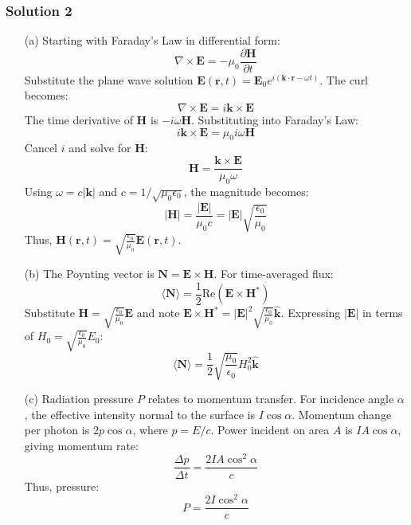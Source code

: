 \documentclass{article}
\begin{document}
\subsubsection{Solution 2}
\begin{enumerate}
    \item[(a)] Starting with Faraday's Law in differential form:
\[
\nabla \times \mathbf{E} = -\mu_0 \frac{\partial \mathbf{H}}{\partial t}
\]
Substitute the plane wave solution \(\mathbf{E}(\mathbf{r}, t) = \mathbf{E}_0 e^{i(\mathbf{k} \cdot \mathbf{r} - \omega t)}\). The curl becomes:
\[
\nabla \times \mathbf{E} = i\mathbf{k} \times \mathbf{E}
\]
The time derivative of \(\mathbf{H}\) is \(-i\omega \mathbf{H}\). Substituting into Faraday's Law:
\[
i\mathbf{k} \times \mathbf{E} = \mu_0 i\omega \mathbf{H}
\]
Cancel \(i\) and solve for \(\mathbf{H}\):
\[
\mathbf{H} = \frac{\mathbf{k} \times \mathbf{E}}{\mu_0 \omega}
\]
Using \(\omega = c|\mathbf{k}|\) and \(c = 1/\sqrt{\mu_0 \epsilon_0}\), the magnitude becomes:
\[
|\mathbf{H}| = \frac{|\mathbf{E}|}{\mu_0 c} = |\mathbf{E}| \sqrt{\frac{\epsilon_0}{\mu_0}}
\]
Thus, \(\mathbf{H}(\mathbf{r}, t) = \sqrt{\frac{\epsilon_0}{\mu_0}} \mathbf{E}(\mathbf{r}, t)\).

    \item[(b)] The Poynting vector is \(\mathbf{N} = \mathbf{E} \times \mathbf{H}\). For time-averaged flux:
\[
\langle \mathbf{N} \rangle = \frac{1}{2} \text{Re}(\mathbf{E} \times \mathbf{H}^*)
\]
Substitute \(\mathbf{H} = \sqrt{\frac{\epsilon_0}{\mu_0}} \mathbf{E}\) and note \(\mathbf{E} \times \mathbf{H}^* = |\mathbf{E}|^2 \sqrt{\frac{\epsilon_0}{\mu_0}} \hat{\mathbf{k}}\). Expressing \(|\mathbf{E}|\) in terms of \(H_0 = \sqrt{\frac{\epsilon_0}{\mu_0}} E_0\):
\[
\langle \mathbf{N} \rangle = \frac{1}{2} \sqrt{\frac{\mu_0}{\epsilon_0}} H_0^2 \hat{\mathbf{k}}
\]

    \item[(c)] Radiation pressure \(P\) relates to momentum transfer. For incidence angle \(\alpha\), the effective intensity normal to the surface is \(I \cos\alpha\). Momentum change per photon is \(2p \cos\alpha\), where \(p = E/c\). Power incident on area \(A\) is \(I A \cos\alpha\), giving momentum rate:
\[
\frac{\Delta p}{\Delta t} = \frac{2I A \cos^2\alpha}{c}
\]
Thus, pressure:
\[
P = \frac{2I \cos^2\alpha}{c}
\]
\end{enumerate}
\end{document}
